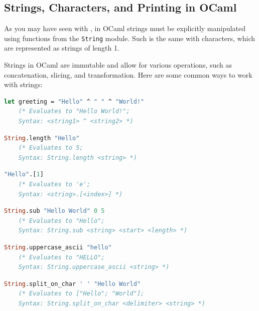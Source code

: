 \newpage

\subsection{Strings, Characters, and Printing in OCaml}

As you may have seen with , in OCaml strings must be explicitly manipulated using functions from the 
\texttt{String} module. Such is the same with characters, which are represented as strings of length 1.

\begin{Def}

Strings in OCaml are immutable and allow for various operations, such as concatenation, slicing, and transformation. Here are some common ways to work with strings:

    \begin{lstlisting}[language=OCaml, caption={Creating and Concatenating Strings}, numbers=none]
    let greeting = "Hello" ^ " " ^ "World!"
    (* Evaluates to "Hello World!"; 
    Syntax: <string1> ^ <string2> *)
    \end{lstlisting}

    \begin{lstlisting}[language=OCaml, caption={Getting the Length of a String}, numbers=none]
    String.length "Hello"
    (* Evaluates to 5; 
    Syntax: String.length <string> *)
    \end{lstlisting}

    \begin{lstlisting}[language=OCaml, caption={Accessing a Character in a String}, numbers=none]
    "Hello".[1]
    (* Evaluates to 'e'; 
    Syntax: <string>.[<index>] *)
    \end{lstlisting}

    \begin{lstlisting}[language=OCaml, caption={Slicing a String}, numbers=none]
    String.sub "Hello World" 0 5
    (* Evaluates to "Hello"; 
    Syntax: String.sub <string> <start> <length> *)
    \end{lstlisting}

    \begin{lstlisting}[language=OCaml, caption={Converting to Uppercase}, numbers=none]
    String.uppercase_ascii "hello"
    (* Evaluates to "HELLO"; 
    Syntax: String.uppercase_ascii <string> *)
    \end{lstlisting}

    \begin{lstlisting}[language=OCaml, caption={Splitting a String by a Delimiter}, numbers=none]
    String.split_on_char ' ' "Hello World"
    (* Evaluates to ["Hello"; "World"]; 
    Syntax: String.split_on_char <delimiter> <string> *)
    \end{lstlisting}
\end{Def}


